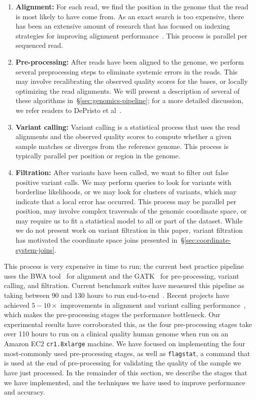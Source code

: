 \documentclass{acm_proc_article-sp}
\begin{document}
\begin{enumerate}
\item \textbf{Alignment:} For each read, we find the position in the genome that the read is most likely to
have come from. As an exact search is too expensive, there has been an extensive amount of research
that has focused on indexing strategies for improving alignment performance~\cite{li10, li11,
zaharia11}. This process is parallel per sequenced read.
\item \textbf{Pre-processing:} After reads have been aligned to the genome, we perform several
preprocessing steps to eliminate systemic errors in the reads. This may involve recalibrating the
observed quality scores for the bases, or locally optimizing the read alignments. We will present a
description of several of these algorithms in~\S\ref{sec:genomics-pipeline}; for a more detailed
discussion, we refer readers to DePristo et al~\cite{depristo11}.
\item \textbf{Variant calling:} Variant calling is a statistical process that uses the read alignments
and the observed quality scores to compute whether a given sample \linebreak matches or diverges
from the reference genome. This process is typically parallel per position or region in the genome.
\item \textbf{Filtration:} After variants have been called, we want to filter out false positive variant calls.
We may perform queries to look for variants with borderline likelihoods, or we may look for clusters of
variants, which may indicate that a local error has occurred. This process may be parallel per position,
may involve complex traversals of the genomic coordinate space, or may require us to fit a statistical
model to all or part of the dataset. While we do not present work on variant filtration in this paper, variant
filtration has motivated the coordinate space joins presented in~\S\ref{sec:coordinate-system-joins}.
\end{enumerate}

This process is very expensive in time to run; the current best practice pipeline uses the BWA tool~\cite{li10} for
alignment and the GATK~\cite{depristo11, mckenna10} for pre-processing, variant calling, and filtration.
Current benchmark suites have measured this pipeline as taking between 90 and 130 hours to run
end-to-end~\cite{talwalkar14}. Recent projects have achieved $5-10\times$ improvements in alignment
and variant calling performance~\cite{rimmer14, zaharia11}, which makes the pre-processing stages
the performance bottleneck. Our experimental results have corroborated this, as the four pre-processing stages
take over 110 hours to run on a clinical quality human genome when run on an Amazon EC2 \texttt{cr1.8xlarge}
machine. We have focused on implementing the four most-commonly used pre-processing stages, as well as
\texttt{flagstat}, a command that is used at the end of pre-processing for validating the quality of the sample
we have just processed. In the remainder of this section, we describe the stages that we have implemented, and
the techniques we have used to improve performance and accuracy.
\end{document}
